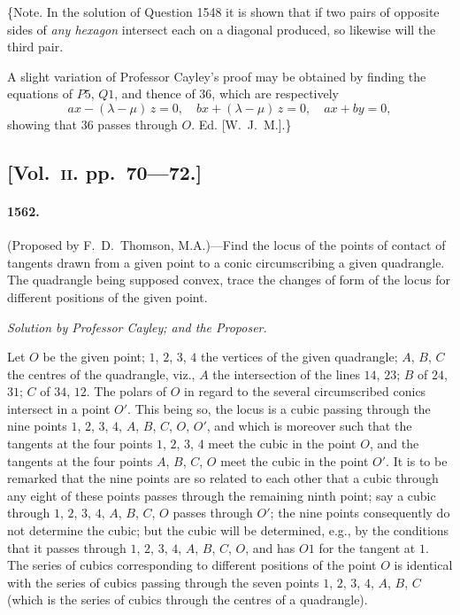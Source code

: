 \documentclass[11pt,a4paper]{article}
\begin{document}
\{Note. In the solution of Question 1548 it is shown that if two pairs of
opposite sides of \textit{any hexagon} intersect each on a diagonal produced, so likewise will
the third pair.

A slight variation of Professor Cayley's proof may be obtained by finding the
equations of $P5$, $Q1$, and thence of $36$, which are respectively
\[
ax - (\lambda - \mu)\,z = 0, \quad bx + (\lambda - \mu)\,z = 0, \quad ax + by = 0,
\]
showing that $36$ passes through $O$. Ed. [W.~J.~M.].\}

\subsection*{[Vol.~\textsc{ii}. pp.\ 70---72.]}

\paragraph*{1562.} (Proposed by F.~D.~Thomson, M.A.)---Find the locus of the points of contact
of tangents drawn from a given point to a conic circumscribing a given quadrangle.
The quadrangle being supposed convex, trace the changes of form of the locus for
different positions of the given point.

\begin{center}
\textit{Solution by Professor Cayley; and the Proposer.}
\end{center}

Let $O$ be the given point; $1$, $2$, $3$, $4$ the vertices of the given quadrangle;
$A$, $B$, $C$ the centres of the quadrangle, viz., $A$ the intersection of the lines $14$, $23$;
$B$ of $24$, $31$; $C$ of $34$, $12$. The polars of $O$ in regard to the several circumscribed
conics intersect in a point $O'$. This being so, the locus is a cubic passing through
the nine points $1$, $2$, $3$, $4$, $A$, $B$, $C$, $O$, $O'$, and which is moreover such that the
tangents at the four points $1$, $2$, $3$, $4$ meet the cubic in the point $O$, and the
tangents at the four points $A$, $B$, $C$, $O$ meet the cubic in the point $O'$. It is to be
remarked that the nine points are so related to each other that a cubic through
any eight of these points passes through the remaining ninth point; say a cubic
through $1$, $2$, $3$, $4$, $A$, $B$, $C$, $O$ passes through $O'$; the nine points consequently do
not determine the cubic; but the cubic will be determined, e.g., by the conditions
that it passes through $1$, $2$, $3$, $4$, $A$, $B$, $C$, $O$, and has $O1$ for the tangent at $1$.
The series of cubics corresponding to different positions of the point $O$ is identical
with the series of cubics passing through the seven points $1$, $2$, $3$, $4$, $A$, $B$, $C$
(which is the series of cubics through the centres of a quadrangle).
\end{document}
